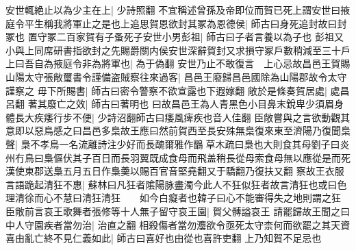 安世輒絶止以為少主在上|{
	少詩照翻}
不宜稱述曾孫及帝即位而賀已死上謂安世曰掖庭令平生稱我將軍止之是也上追思賀恩欲封其冢為恩德侯|{
	師古曰身死追封故曰封冢也}
置守冢二百家賀有子蚤死子安世小男彭祖|{
	師古曰子者言養以為子也}
彭祖又小與上同席研書指欲封之先賜爵關内侯安世深辭賀封又求損守冢戶數稍減至三十戶上曰吾自為掖庭令非為將軍也|{
	為于偽翻}
安世乃止不敢復言　上心忌故昌邑王賀賜山陽太守張敞璽書令謹備盗賊察往來過客|{
	昌邑王廢歸昌邑國除為山陽郡故令太守謹察之}
毋下所賜書|{
	師古曰密令警察不欲宣露也下遐嫁翻}
敞於是條奏賀居處|{
	處昌呂翻}
著其廢亡之效|{
	師古曰著明也}
曰故昌邑王為人青黑色小目鼻末銳卑少須眉身體長大疾痿行步不便|{
	少詩沼翻師古曰痿風痺疾也音人佳翻}
臣敞嘗與之言欲動觀其意即以惡鳥感之曰昌邑多梟故王應曰然前賀西至長安殊無梟復來東至濟陽乃復聞梟聲|{
	梟不孝鳥一名流離詩注少好而長醜爾雅作鶹草木疏曰梟也大則食其母劉子曰炎州冇鳥曰梟傴伏其子百日而長羽翼既成食母而飛盖稍長從母索食母無以應從是而死漢使東郡送梟五月五日作梟羮以賜百官音堅堯翻又于驕翻乃復扶又翻}
察故王衣服言語跪起清狂不惠|{
	蘇林曰凡狂者隂陽脉盡濁今此人不狂似狂者故言清狂也或曰色理清徐而心不慧曰清狂清狂　　如今白癡者也韓子曰心不能審得失之地則謂之狂}
臣敞前言哀王歌舞者張修等十人無子留守哀王園|{
	賀父髆謚哀王}
請罷歸故王聞之曰中人守園疾者當勿治|{
	治直之翻}
相殺傷者當勿灋欲令亟死太守柰何而欲罷之其天資喜由亂亡終不見仁義如此|{
	師古曰喜好也由從也喜許吏翻}
上乃知賀不足忌也

